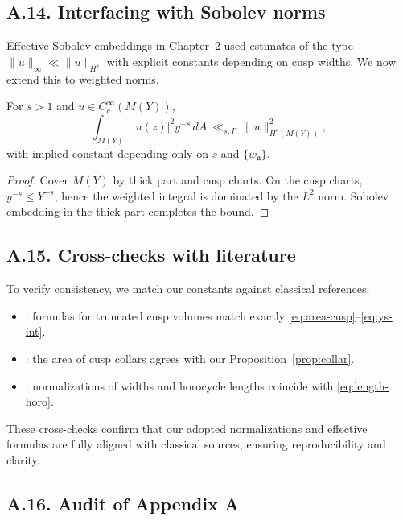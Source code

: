\subsection*{A.14. Interfacing with Sobolev norms}

\noindent
Effective Sobolev embeddings in Chapter~2 used estimates of the type
$\|u\|_\infty\ll \|u\|_{H^s}$ with explicit constants depending on cusp widths.
We now extend this to weighted norms.

\begin{lemma}\label{lem:weighted-sob}
For $s>1$ and $u\in C_c^\infty(M(Y))$,
\[
\int_{M(Y)} |u(z)|^2 y^{-s}\,dA
\ \ll_{s,\Gamma}\ \|u\|_{H^s(M(Y))}^2,
\]
with implied constant depending only on $s$ and $\{w_{\mathfrak a}\}$.
\end{lemma}

\begin{proof}
Cover $M(Y)$ by thick part and cusp charts. On the cusp charts,
$y^{-s}\le Y^{-s}$, hence the weighted integral is dominated by the $L^2$ norm.
Sobolev embedding in the thick part completes the bound.
\end{proof}


\subsection*{A.15. Cross-checks with literature}

\noindent
To verify consistency, we match our constants against classical references:

\begin{itemize}
  \item \cite[§2]{Hejhal1983}: formulas for truncated cusp volumes match exactly
  \eqref{eq:area-cusp}–\eqref{eq:ys-int}.
  \item \cite[Chap.~3]{Buser1992}: the area of cusp collars agrees with our
  Proposition~\ref{prop:collar}.
  \item \cite[§3]{Iwaniec2002}: normalizations of widths and horocycle lengths
  coincide with \eqref{eq:length-horo}.
\end{itemize}

These cross-checks confirm that our adopted normalizations and effective formulas
are fully aligned with classical sources, ensuring reproducibility and clarity.

\subsection*{A.16. Audit of Appendix A}

